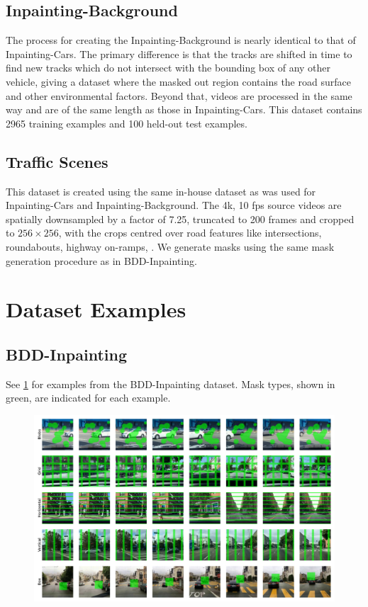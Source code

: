\subsection{Inpainting-Background}
 The process for creating the Inpainting-Background is nearly identical to that of Inpainting-Cars. The primary difference is that the tracks are shifted in time to find new tracks which do not intersect with the bounding box of any other vehicle, giving a dataset where the masked out region contains the road surface and other environmental factors. Beyond that, videos are processed in the same way and are of the same length as those in Inpainting-Cars. This dataset contains 2965 training examples and 100 held-out test examples.  

 \subsection{Traffic Scenes}
This dataset is created using the same in-house dataset as was used for Inpainting-Cars and Inpainting-Background. The 4k, 10 fps source videos are spatially downsampled by a factor of 7.25, truncated to 200 frames and cropped to $256 \times 256$, with the crops centred over road features like intersections, roundabouts, highway on-ramps, \etc. We generate masks using the same mask generation procedure as in BDD-Inpainting. 
\section{Dataset Examples}
\label{sec:datasetexamples}
\subsection{BDD-Inpainting}
See \cref{fig:bdd-examples} for examples from the BDD-Inpainting dataset. Mask types, shown in green, are indicated for each example.
\begin{figure}[h!]
\begin{center}
    \centering
    \captionsetup{type=figure}
    \includegraphics[width=\linewidth]{figures/dataset-examples/bdd-examples.pdf}
    \label{fig:bdd-examples}
\end{center}
\end{figure}
